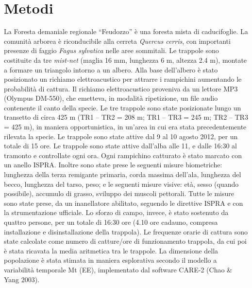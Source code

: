\section*{Metodi}
La Foresta demaniale regionale
{\textquotedblleft}Feudozzo{\textquotedblright} \`e una foresta mista
di caducifoglie. La comunit\`a arborea \`e riconducibile alla cerreta
\textit{Quercus cerris}, con importanti presenze di faggio
\textit{Fagus sylvatica }nelle aree sommitali. Le trappole sono
costituite da tre \textit{mist-net }(maglia 16 mm, lunghezza 6 m,
altezza 2.4 m), montate a formare un triangolo intorno a un albero.
Alla base dell{\textquoteright}albero \`e stato posizionato un richiamo
elettroacustico per attrarre i rampichini aumentando le probabilit\`a
di cattura. Il richiamo elettroacustico proveniva da un lettore MP3
(Olympus DM-550), che emetteva, in modalit\`a ripetizione, un file
audio contenente il canto della specie. Le tre trappole sono state
posizionate lungo un transetto di circa 425 m (TR1 -- TR2 = 208 m; TR1
-- TR3 = 245 m; TR2 -- TR3 = 425 m), in maniera opportunistica, in
un{\textquoteright}area in cui era stata precedentemente rilevata la
specie. Le trappole sono state attive dal 9 al 10 agosto 2012, per un
totale di 15 ore. Le trappole sono state attive
dall{\textquoteright}alba alle 11, e dalle 16:30 al tramonto e
controllate ogni ora. Ogni rampichino catturato \`e stato marcato con
un anello ISPRA. Inoltre sono state prese le seguenti misure
biometriche: lunghezza della terza remigante primaria, corda massima
dell{\textquoteright}ala, lunghezza del becco, lunghezza del tarso,
peso; e le seguenti misure visive: et\`a, sesso (quando possibile),
accumulo di grasso, sviluppo dei muscoli pettorali. Tutte le misure
sono state prese, da un inanellatore abilitato, seguendo le direttive
ISPRA e con la strumentazione ufficiale. Lo sforzo di campo, invece,
\`e stato sostenuto da quattro persone, per un totale di 16:30 ore
(4.10 ore cadauno, compresa installazione e disinstallazione della
trappola). Le frequenze orarie di cattura sono state calcolate come
numero di catture/ore di funzionamento trappola, da cui poi \`e stata
ricavata la media aritmetica tra le trappole. La dimensione della
popolazione \`e stata stimata in maniera esplorativa secondo il modello
a variabilit\`a temporale Mt (EE), implementato dal software CARE-2
(Chao \& Yang 2003).

